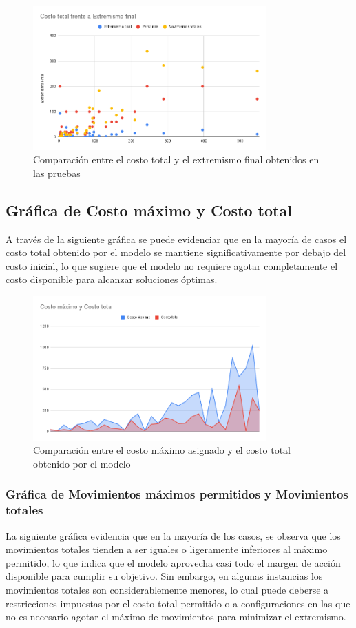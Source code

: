 \documentclass[11pt,letter]{article}
\begin{document}
\begin{figure}[H]
    \centering
    \includegraphics[width=0.8\textwidth]{resources/costototalvsextremismofinal.png}
    \caption{Comparación entre el costo total y el extremismo final obtenidos en las pruebas}
\end{figure}

\subsection{Gráfica de Costo máximo y Costo total}

A través de la siguiente gráfica se puede evidenciar que en la mayoría de casos el costo total obtenido por el modelo se mantiene significativamente por debajo del costo inicial, lo que sugiere que el modelo no requiere agotar completamente el costo disponible para alcanzar soluciones óptimas.

\begin{figure}[H]
    \centering
    \includegraphics[width=0.8\textwidth]{resources/costomaximoycostototal.png}
    \caption{Comparación entre el costo máximo asignado y el costo total obtenido por el modelo}
\end{figure}


\subsubsection*{Gráfica de Movimientos máximos permitidos y Movimientos totales}
La siguiente gráfica evidencia  que en la mayoría de los casos, se observa que los movimientos totales tienden a ser iguales o ligeramente inferiores al máximo permitido, lo que indica que el modelo aprovecha casi todo el margen de acción disponible para cumplir su objetivo. Sin embargo, en algunas instancias los movimientos totales son considerablemente menores, lo cual puede deberse a restricciones impuestas por el costo total permitido o a configuraciones en las que no es necesario agotar el máximo de movimientos para minimizar el extremismo. 
\end{document}
